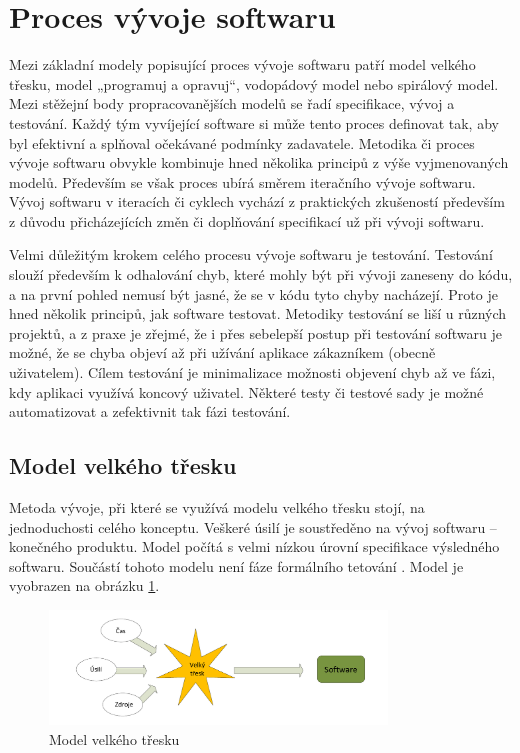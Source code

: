 \section{Proces vývoje softwaru}
Mezi základní modely popisující proces vývoje softwaru patří model velkého třesku, model „programuj a opravuj“, vodopádový model nebo spirálový model. Mezi stěžejní body propracovanějších modelů se řadí specifikace, vývoj a testování. Každý tým vyvíjející software si může tento proces definovat tak, aby byl efektivní a splňoval očekávané podmínky zadavatele. Metodika či proces vývoje softwaru obvykle kombinuje hned několika principů z výše vyjmenovaných modelů. Především se však proces ubírá směrem iteračního vývoje softwaru. Vývoj softwaru v iteracích či cyklech vychází z praktických zkušeností především z důvodu přicházejících změn či doplňování specifikací už při vývoji softwaru.

Velmi důležitým krokem celého procesu vývoje softwaru je testování. Testování slouží především k odhalování chyb, které mohly být při vývoji zaneseny do kódu, a na první pohled nemusí být jasné, že se v kódu tyto chyby nacházejí. Proto je hned několik principů, jak software testovat. Metodiky testování se liší u různých projektů, a z praxe je zřejmé, že i přes sebelepší postup při testování softwaru je možné, že se chyba objeví až při užívání aplikace zákazníkem (obecně uživatelem). Cílem testování je minimalizace možnosti objevení chyb až ve fázi, kdy aplikaci využívá koncový uživatel. Některé testy či testové sady je možné automatizovat a zefektivnit tak fázi testování.

\subsection{Model velkého třesku}
Metoda vývoje, při které se využívá modelu velkého třesku stojí, na jednoduchosti celého konceptu. Veškeré úsilí je soustředěno na vývoj softwaru – konečného produktu. Model počítá s velmi nízkou úrovní specifikace výsledného softwaru. Součástí tohoto modelu není fáze formálního tetování \cite{Patton2002}. Model je vyobrazen na obrázku \ref{fig:big-bang-model}.


\begin{figure}[!h]
	\centering
	\includegraphics[width=0.8\textwidth]{Figures/VelkyTresk.pdf}
	\caption{Model velkého třesku}
	\label{fig:big-bang-model}
\end{figure}
\newpage
